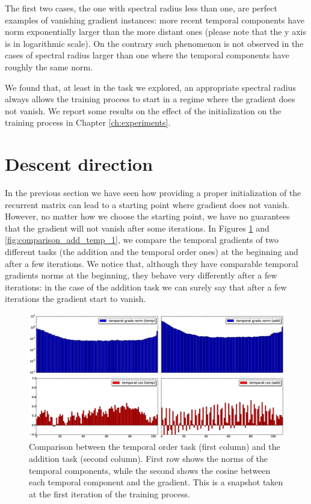 The first two cases, the one with spectral radius less than one, are perfect examples of vanishing gradient instances: more recent temporal components have norm exponentially larger than the more distant ones (please note that the y axis is in logarithmic scale). On the contrary such phenomenon is not observed in the cases of spectral radius larger than one where the temporal components have roughly the same norm.

We found that, at least in the task we explored, an appropriate spectral radius always allows the training process to start in a regime where the gradient does not vanish. We report some results on the effect of the initialization on the training process in Chapter \ref{ch:experiments}.

\section{Descent direction}
In the previous section we have seen how providing a proper initialization of the recurrent matrix can lead to a starting point where gradient does not vanish. However, no matter how we choose the starting point, we have no guarantees that the gradient will not vanish after some iterations. In Figures \ref{fig:comparison_add_temp_0} and \ref{fig:comparison_add_temp_1}, we compare the temporal gradients of two different tasks (the addition and the temporal order ones) at the beginning and after a few iterations.
We notice that, although they have comparable temporal gradients norms at the beginning, they behave very differently after a few iterations: in the case of the addition task we can surely say that after a few iterations the gradient start to vanish.

\begin{figure}[h]
	\includegraphics[width=1\textwidth]{chapter3/compare_add_temp_norms_0.eps}
	\caption{Comparison between the temporal order task (first column) and the addition task (second column). First row shows the norms of the temporal components, while the second shows the cosine between each temporal component and the gradient. This is a snapshot taken at the first iteration of the training process.}
	\label{fig:comparison_add_temp_0}
\end{figure}

